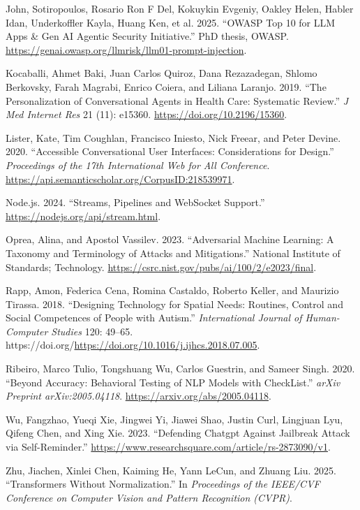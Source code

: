 \documentclass[
]{article}
\newlength{\cslhangindent}
\newenvironment{CSLReferences}[2] %
 {\begin{list}{}{%
  \setlength{\itemindent}{0pt}
  \setlength{\leftmargin}{0pt}
  \setlength{\parsep}{0pt}
  \ifodd #1
   \setlength{\leftmargin}{\cslhangindent}
   \setlength{\itemindent}{-1\cslhangindent}
  \fi
  \setlength{\itemsep}{#2\baselineskip}}}
 {\end{list}}
\begin{document}
\begin{CSLReferences}{1}{0}
John, Sotiropoulos, Rosario Ron F Del, Kokuykin Evgeniy, Oakley Helen,
Habler Idan, Underkoffler Kayla, Huang Ken, et al. 2025. {``OWASP Top 10
for LLM Apps \& Gen AI Agentic Security Initiative.''} PhD thesis,
OWASP. \url{https://genai.owasp.org/llmrisk/llm01-prompt-injection}.

Kocaballi, Ahmet Baki, Juan Carlos Quiroz, Dana Rezazadegan, Shlomo
Berkovsky, Farah Magrabi, Enrico Coiera, and Liliana Laranjo. 2019.
{``The Personalization of Conversational Agents in Health Care:
Systematic Review.''} \emph{J Med Internet Res} 21 (11): e15360.
\url{https://doi.org/10.2196/15360}.

Lister, Kate, Tim Coughlan, Francisco Iniesto, Nick Freear, and Peter
Devine. 2020. {``Accessible Conversational User Interfaces:
Considerations for Design.''} \emph{Proceedings of the 17th
International Web for All Conference}.
\url{https://api.semanticscholar.org/CorpusID:218539971}.

Node.js. 2024. {``Streams, Pipelines and WebSocket Support.''}
\url{https://nodejs.org/api/stream.html}.

Oprea, Alina, and Apostol Vassilev. 2023. {``Adversarial Machine
Learning: A Taxonomy and Terminology of Attacks and Mitigations.''}
National Institute of Standards; Technology.
\url{https://csrc.nist.gov/pubs/ai/100/2/e2023/final}.

Rapp, Amon, Federica Cena, Romina Castaldo, Roberto Keller, and Maurizio
Tirassa. 2018. {``Designing Technology for Spatial Needs: Routines,
Control and Social Competences of People with Autism.''}
\emph{International Journal of Human-Computer Studies} 120: 49--65.
https://doi.org/\url{https://doi.org/10.1016/j.ijhcs.2018.07.005}.

Ribeiro, Marco Tulio, Tongshuang Wu, Carlos Guestrin, and Sameer Singh.
2020. {``Beyond Accuracy: Behavioral Testing of NLP Models with
CheckList.''} \emph{arXiv Preprint arXiv:2005.04118}.
\url{https://arxiv.org/abs/2005.04118}.

Wu, Fangzhao, Yueqi Xie, Jingwei Yi, Jiawei Shao, Justin Curl, Lingjuan
Lyu, Qifeng Chen, and Xing Xie. 2023. {``Defending Chatgpt Against
Jailbreak Attack via Self-Reminder.''}
\url{https://www.researchsquare.com/article/rs-2873090/v1}.

Zhu, Jiachen, Xinlei Chen, Kaiming He, Yann LeCun, and Zhuang Liu. 2025.
{``Transformers Without Normalization.''} In \emph{Proceedings of the
IEEE/CVF Conference on Computer Vision and Pattern Recognition (CVPR)}.

\end{CSLReferences}
\end{document}
